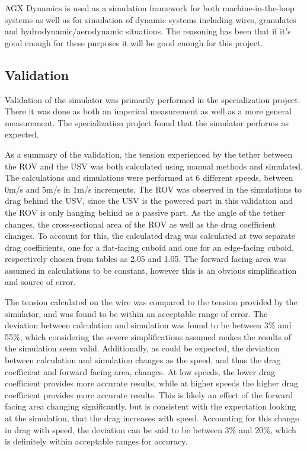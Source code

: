 \documentclass[class=article, crop=false]{standalone}
\begin{document}
AGX Dynamics is used as a simulation framework for both machine-in-the-loop systems as well as for simulation of dynamic systems including wires, granulates and hydrodynamic/aerodynamic situations. The reasoning has been that if it's good enough for these purposes it will be good enough for this project.

\subsection{Validation}
Validation of the simulator was primarily performed in the specialization project. There it was done as both an imperical measurement as well as a more general measurement. The specialization project found that the simulator performs as expected.

As a summary of the validation, the tension experienced by the tether between the ROV and the USV was both calculated using manual methods and simulated. The calculations and simulations were performed at 6 different speeds, between 0m/s and 5m/s in 1m/s increments. The ROV was observed in the simulations to drag behind the USV, since the USV is the powered part in this validation and the ROV is only hanging behind as a passive part. As the angle of the tether changes, the cross-sectional area of the ROV as well as the drag coefficient changes. To account for this, the calculated drag was calculated at two separate drag coefficients, one for a flat-facing cuboid and one for an edge-facing cuboid, respectively chosen from tables as 2.05 and 1.05. The forward facing area was assumed in calculations to be constant, however this is an obvious simplification and source of error.

The tension calculated on the wire was compared to the tension provided by the simulator, and was found to be within an acceptable range of error. The deviation between calculation and simulation was found to be between 3\% and 55\%, which considering the severe simplifications assumed makes the results of the simulation seem valid. Additionally, as could be expected, the deviation between calculation and simulation changes as the speed, and thus the drag coefficient and forward facing area, changes. At low speeds, the lower drag coefficient provides more accurate results, while at higher speeds the higher drag coefficient provides more accurate results. This is likely an effect of the forward facing area changing significantly, but is consistent with the expectation looking at the simulation, that the drag increases with speed. Accounting for this change in drag with speed, the deviation can be said to be between 3\% and 20\%, which is definitely within acceptable ranges for accuracy.
\end{document}
